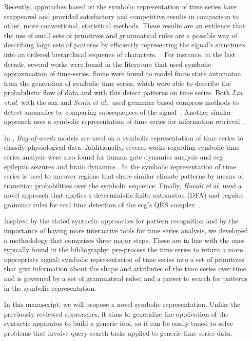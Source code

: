 Recently, approaches based on the symbolic representation of time series have reappeared and provided satisfactory and competitive results in comparison to other, more conventional, statistical methods. These results are an evidence that the use of small sets of primitives and grammatical rules are a possible way of describing large sets of patterns by efficiently representing the signal's structures into an ordered hierarchical sequence of characters.~\cite{Hamdi2017}. For instance, in the last decade, several works were found in the literature that used symbolic approximation of time-series. Some were found to model finite state automaton from the generation of symbolic time series, which were able to describe the probabilistic flow of data and with this detect patterns on time series\cite{Rajagopalan,Piccardi}. Both \textit{Lin} \textit{et.al.} with the \gls{sax} and \textit{Senin} \textit{et al..} used grammar based compress methods to detect anomalies by comparing subsequences of the signal~\cite{sax,Senin}. Another similar approach uses a symbolic representation of time series for information retrieval \cite{YueLi2017}. 
\par
In \cite{Ordonez2011}, \textit{Bag-of-words} models are used on a symbolic representation of time series to classify physiological data. Additionally, several works regarding symbolic time series analysis were also found for human gate dynamics analysis \cite{Abbasi2014,JianYu2017} and \gls{eeg} epileptic seizures and brain dynamics \cite{Hussain2017}. In \cite{Tirabassi2016} the symbolic representation of time series is used to uncover regions that share similar climate patterns by means of transition probabilities over the symbolic sequence. Finally, \textit{Hamdi} \textit{et.al.} used a novel approach that applies a deterministic finite automaton (DFA) and regular grammar rules for real time detection of the \gls{ecg}'s QRS complex~\cite{Hamdi2017}. 
\par
Inspired by the stated syntactic approaches for pattern recognition and by the importance of having more interactive tools for time series analysis, we developed a methodology that comprises three major steps. These are in line with the ones typically found in the bibliography: pre-process the time series to return a more appropriate signal; symbolic representation of time series into a set of primitives that give information about the shape and attributes of the time series over time and is governed by a set of grammatical rules; and a parser to search for patterns in the symbolic representation.
\par
In this manuscript, we will propose a novel symbolic representation. Unlike the previously reviewed approaches, it aims to generalize the application of the syntactic apparatus to build a generic tool, so it can be easily tuned to solve problems that involve query search tasks applied to generic time series data.

